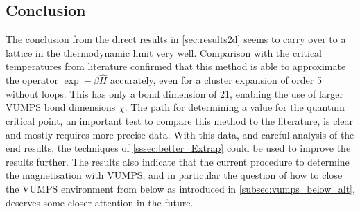 \subsection{Conclusion}

The conclusion from the direct results in \cref{sec:results2d} seems to carry over to a lattice in the thermodynamic limit very well. Comparison with the critical temperatures from literature confirmed that this method is able to approximate the operator $\exp -\beta \hat{H}$ accurately, even for a cluster expansion of order 5 without loops. This has only a bond dimension of 21, enabling the use of larger \Gls{VUMPS} bond dimensions $\chi$.
The path for determining a value for the quantum critical point, an important test  to compare this method to the literature, is clear and mostly requires more precise data. With this data, and careful analysis of the end results, the techniques of \cref{sssec:better_Extrap} could be used to improve  the results further. The results also indicate that the current procedure to determine the magnetisation with \Gls{VUMPS}, and in particular the question of how to close the \Gls{VUMPS} environment from below as introduced in \cref{subsec:vumps_below_alt}, deserves some closer attention in the future.